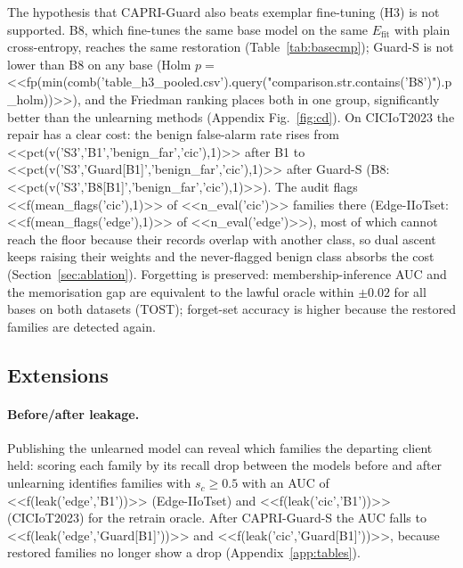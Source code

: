 \documentclass[pdflatex,sn-mathphys-num,iicol]{sn-jnl}
\newcommand{\Efit}{E_{\mathrm{fit}}}
\begin{document}
The hypothesis that CAPRI-Guard also beats exemplar fine-tuning (H3) is not supported. B8, which fine-tunes the same base model on the same $\Efit$ with plain cross-entropy, reaches the same restoration (Table~\ref{tab:basecmp}); Guard-S is not lower than B8 on any base (Holm $p=$ <<fp(min(comb('table_h3_pooled.csv').query("comparison.str.contains('B8')").p_holm))>>), and the Friedman ranking places both in one group, significantly better than the unlearning methods (Appendix Fig.~\ref{fig:cd}). On CICIoT2023 the repair has a clear cost: the benign false-alarm rate rises from <<pct(v('S3','B1','benign_far','cic'),1)>> after B1 to <<pct(v('S3','Guard[B1]','benign_far','cic'),1)>> after Guard-S (B8: <<pct(v('S3','B8[B1]','benign_far','cic'),1)>>). The audit flags <<f(mean_flags('cic'),1)>> of <<n_eval('cic')>> families there (Edge-IIoTset: <<f(mean_flags('edge'),1)>> of <<n_eval('edge')>>), most of which cannot reach the floor because their records overlap with another class, so dual ascent keeps raising their weights and the never-flagged benign class absorbs the cost (Section~\ref{sec:ablation}). Forgetting is preserved: membership-inference AUC and the memorisation gap are equivalent to the lawful oracle within $\pm0.02$ for all bases on both datasets (TOST); forget-set accuracy is higher because the restored families are detected again.





\subsection{Extensions}\label{sec:res-ext}

\paragraph{Before/after leakage.} Publishing the unlearned model can reveal which families the departing client held: scoring each family by its recall drop between the models before and after unlearning identifies families with $s_c\ge0.5$ with an AUC of <<f(leak('edge','B1'))>> (Edge-IIoTset) and <<f(leak('cic','B1'))>> (CICIoT2023) for the retrain oracle. After CAPRI-Guard-S the AUC falls to <<f(leak('edge','Guard[B1]'))>> and <<f(leak('cic','Guard[B1]'))>>, because restored families no longer show a drop (Appendix~\ref{app:tables}).
\end{document}
